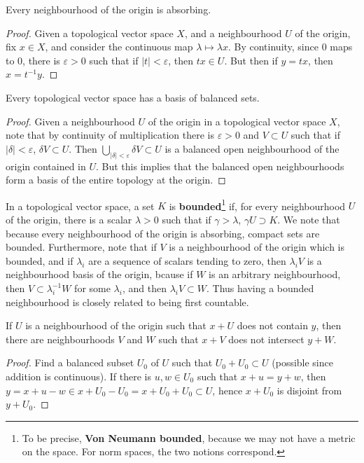 \begin{theorem}
    Every neighbourhood of the origin is absorbing.
\end{theorem}
\begin{proof}
    Given a topological vector space $X$, and a neighbourhood $U$ of the origin, fix $x \in X$, and consider the continuous map $\lambda \mapsto \lambda x$. By continuity, since $0$ maps to $0$, there is $\varepsilon > 0$ such that if $|t| < \varepsilon$, then $t x \in U$. But then if $y = tx$, then $x = t^{-1} y$.
\end{proof}

\begin{theorem}
    Every topological vector space has a basis of balanced sets.
\end{theorem}
\begin{proof}
    Given a neighbourhood $U$ of the origin in a topological vector space $X$, note that by continuity of multiplication there is $\varepsilon > 0$ and $V \subset U$ such that if $|\delta| < \varepsilon$, $\delta V \subset U$. Then $\bigcup_{|\delta| < \varepsilon} \delta V \subset U$ is a balanced open neighbourhood of the origin contained in $U$. But this implies that the balanced open neighbourhoods form a basis of the entire topology at the origin.
\end{proof}

In a topological vector space, a set $K$ is {\bf bounded}\footnote{To be precise, {\bf Von Neumann bounded}, because we may not have a metric on the space. For norm spaces, the two notions correspond.} if, for every neighbourhood $U$ of the origin, there is a scalar $\lambda > 0$ such that if $\gamma > \lambda$, $\gamma U \supset K$. We note that because every neighbourhood of the origin is absorbing, compact sets are bounded. Furthermore, note that if $V$ is a neighbourhood of the origin which is bounded, and if $\lambda_i$ are a sequence of scalars tending to zero, then $\lambda_i V$ is a neighbourhood basis of the origin, bcause if $W$ is an arbitrary neighbourhood, then $V \subset \lambda_i^{-1} W$ for some $\lambda_i$, and then $\lambda_i V \subset W$. Thus having a bounded neighbourhood is closely related to being first countable.

\begin{lemma}
    If $U$ is a neighbourhood of the origin such that $x + U$ does not contain $y$, then there are neighbourhoods $V$ and $W$ such that $x + V$ does not intersect $y + W$.
\end{lemma}
\begin{proof}
    Find a balanced subset $U_0$ of $U$ such that $U_0 + U_0 \subset U$ (possible since addition is continuous). If there is $u,w \in U_0$ such that $x + u = y + w$, then $y = x + u - w \in x + U_0 - U_0 = x + U_0 + U_0 \subset U$, hence $x + U_0$ is disjoint from $y + U_0$.
\end{proof}

